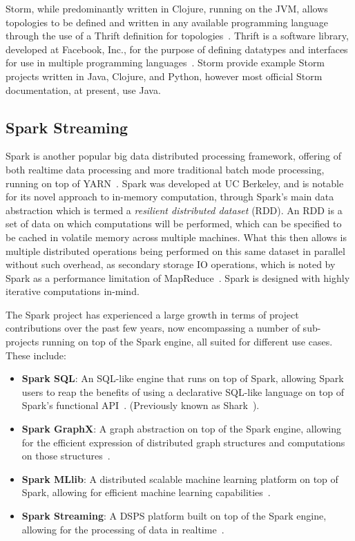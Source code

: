 Storm, while predominantly written in Clojure, running on the JVM, allows topologies to be defined and written in any
available programming language through the use of a Thrift definition for topologies~\cite{About8:online}. Thrift is
a software library, developed at Facebook, Inc., for the purpose of defining datatypes and interfaces for use in
multiple programming languages~\cite{slee2007thrift}. Storm provide example Storm projects written in Java, Clojure,
and Python, however most official Storm documentation, at present, use Java.



\subsection{Spark Streaming} %
\label{ssub:spark_streaming}

Spark is another popular big data distributed processing framework, offering of both realtime data processing
and more traditional batch mode processing, running on top of YARN~\cite{zaharia2010spark}. Spark was developed at UC
Berkeley, and is notable for its novel approach to in-memory computation, through Spark's main data abstraction which is
termed a \textit{resilient distributed dataset} (RDD). An RDD is a set of data on which computations will be performed,
which can be specified to be cached in volatile memory across multiple machines. What this then allows is multiple
distributed operations being performed on this same dataset in parallel without such overhead, as secondary storage
IO operations, which is noted by Spark as a performance limitation of MapReduce~\cite{davidson2013optimizing}. Spark is designed with highly iterative
computations in-mind.

The Spark project has experienced a large growth in terms of project contributions over the past few years, now
encompassing a number of sub-projects running on top of the Spark engine, all suited for different use cases. These
include:

\begin{itemize}
  \item \textbf{Spark SQL}: An SQL-like engine that runs on top of Spark,
  allowing Spark users to reap the benefits of using a declarative SQL-like language on top of Spark's functional
  API~\cite{armbrustspark}. (Previously known as Shark~\cite{xin2013shark}).
  \item \textbf{Spark GraphX}: A graph abstraction on top of the Spark engine, allowing for the efficient expression of
  distributed graph structures and computations on those structures~\cite{xin2013graphx}.
  \item \textbf{Spark MLlib}: A distributed scalable machine learning platform on top of Spark, allowing for efficient
  machine learning capabilities~\cite{sparks2013mli}.
  \item \textbf{Spark Streaming}: A DSPS platform built on top of the Spark engine, allowing for the processing of data
  in realtime~\cite{zaharia2012discretized}.
\end{itemize}

